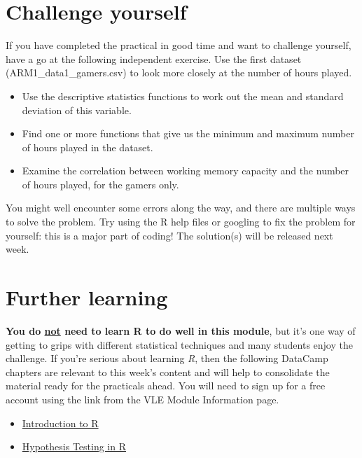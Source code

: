 \documentclass[
  a4paper,
  DIV=11,
  numbers=noendperiod]{scrreprt}
\providecommand{\tightlist}{%
  \setlength{\itemsep}{0pt}\setlength{\parskip}{0pt}}
\begin{document}
\section{Challenge yourself}\label{challenge-yourself}

If you have completed the practical in good time and want to challenge
yourself, have a go at the following independent exercise. Use the first
dataset (ARM1\_data1\_gamers.csv) to look more closely at the number of
hours played.

\begin{itemize}
\tightlist
\item
  Use the descriptive statistics functions to work out the mean and
  standard deviation of this variable.
\item
  Find one or more functions that give us the minimum and maximum number
  of hours played in the dataset.
\item
  Examine the correlation between working memory capacity and the number
  of hours played, for the gamers only.
\end{itemize}

You might well encounter some errors along the way, and there are
multiple ways to solve the problem. Try using the R help files or
googling to fix the problem for yourself: this is a major part of
coding! The solution(s) will be released next week.

\section{Further learning}\label{further-learning}

\textbf{You do \ul{not} need to learn R to do well in this module}, but
it's one way of getting to grips with different statistical techniques
and many students enjoy the challenge. If you're serious about learning
\emph{R}, then the following DataCamp chapters are relevant to this
week's content and will help to consolidate the material ready for the
practicals ahead. You will need to sign up for a free account using the
link from the VLE Module Information page.

\begin{itemize}
\tightlist
\item
  \href{https://app.datacamp.com/learn/courses/free-introduction-to-r}{Introduction
  to R}
\item
  \href{https://app.datacamp.com/learn/courses/hypothesis-testing-in-r}{Hypothesis
  Testing in R}
\end{itemize}
\end{document}
